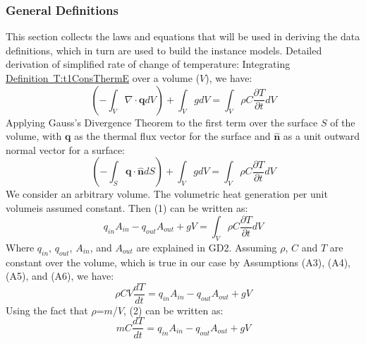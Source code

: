\documentclass[12pt]{article}
\begin{document}
\subsubsection{General Definitions}
\label{Sec:GeneDefi}
This section collects the laws and equations that will be used in deriving the data definitions, which in turn are used to build the instance models.
Detailed derivation of simplified rate of change of temperature:
Integrating \hyperref[T:t1ConsThermE]{Definition~T:t1ConsThermE} over a volume ($V$), we have:
\begin{equation}
(-\int_{V}{\nabla{}\cdot{}\mathbf{q}dV})+\int_{V}{gdV}=\int_{V}{\rho{}C\frac{\partial{}T}{\partial{}t}dV}
\end{equation}
Applying Gauss's Divergence Theorem to the first term over the surface $S$ of the volume, with $\mathbf{q}$ as the thermal flux vector for the surface and $\mathbf{\hat{n}}$ as a unit outward normal vector for a surface:
\begin{equation}
(-\int_{S}{\mathbf{q}\cdot{}\mathbf{\hat{n}}dS})+\int_{V}{gdV}=\int_{V}{\rho{}C\frac{\partial{}T}{\partial{}t}dV}
\end{equation}
We consider an arbitrary volume. The volumetric heat generation per unit volumeis assumed constant. Then (1) can be written as:
\begin{equation}
q_{in}A_{in}-q_{out}A_{out}+gV=\int_{V}{\rho{}C\frac{\partial{}T}{\partial{}t}dV}
\end{equation}
Where $q_{in}$, $q_{out}$, $A_{in}$, and $A_{out}$ are explained in GD2. Assuming $\rho{}$, $C$ and $T$ are constant over the volume, which is true in our case by Assumptions (A3), (A4), (A5), and (A6), we have:
\begin{equation}
\rho{}CV\frac{dT}{dt}=q_{in}A_{in}-q_{out}A_{out}+gV
\end{equation}
Using the fact that $\rho{}$=$m$/$V$, (2) can be written as:
\begin{equation}
mC\frac{dT}{dt}=q_{in}A_{in}-q_{out}A_{out}+gV
\end{equation}
\end{document}
